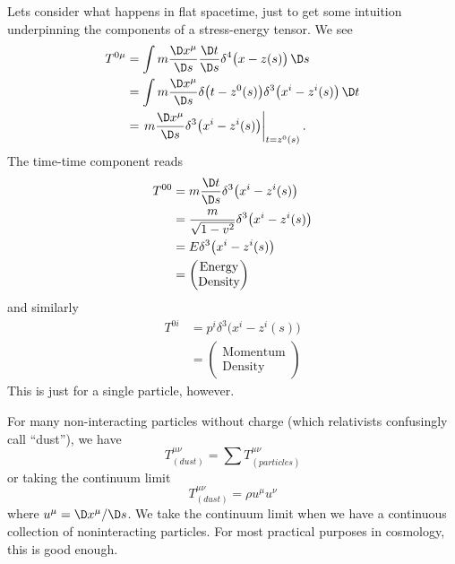 Lets consider what happens in flat spacetime, just to get some
intuition underpinning the components of a stress-energy
tensor. We see
\begin{subequations}
\begin{align}
T^{0\mu}
&=\int m\frac{\D x^{\mu}}{\D s}\frac{\D t}{\D s}\delta^{4}\bigl(x-z(s)\bigr)\,\D s\\
&=\int m\frac{\D x^{\mu}}{\D s}\delta\bigl(t-z^{0}(s)\bigr)\delta^{3}\bigl(x^{i}-z^{i}(s)\bigr)\,\D t\\
&=\left.m\frac{\D x^{\mu}}{\D s}\delta^{3}\bigl(x^{i}-z^{i}(s)\bigr)\right|_{t=z^{0}(s)}.
\end{align}
\end{subequations}
The time-time component reads
\begin{subequations}
\begin{align}
T^{00}
&=m\frac{\D t}{\D s}\delta^{3}\bigl(x^{i}-z^{i}(s)\bigr)\\
&=\frac{m}{\sqrt{1-v^{2}}}\delta^{3}\bigl(x^{i}-z^{i}(s)\bigr)\\
&=E\delta^{3}\bigl(x^{i}-z^{i}(s)\bigr)\\
&=\begin{pmatrix}\mbox{Energy}\\\mbox{Density}
\end{pmatrix}\nonumber
\end{align}
\end{subequations}
and similarly
\begin{equation}
\begin{split}
T^{0i}
&=p^{i}\delta^{3}\bigl(x^{i}-z^{i}(s)\bigr)\\
&=\begin{pmatrix}\mbox{Momentum}\\\mbox{Density}
\end{pmatrix}
\end{split}
\end{equation}
This is just for a single particle, however.

For many non-interacting particles without charge (which
relativists confusingly call ``dust''), we have
\begin{equation}
T^{\mu\nu}_{(dust)}=\sum T^{\mu\nu}_{(particles)}
\end{equation}
or taking the continuum limit 
\begin{equation}
T^{\mu\nu}_{(dust)}=\rho u^{\mu}u^{\nu}
\end{equation}
where $u^{\mu}=\D x^{\mu}/\D s$. We take the continuum limit when
we have a continuous collection of noninteracting particles. For
most practical purposes in cosmology, this is good enough. 

